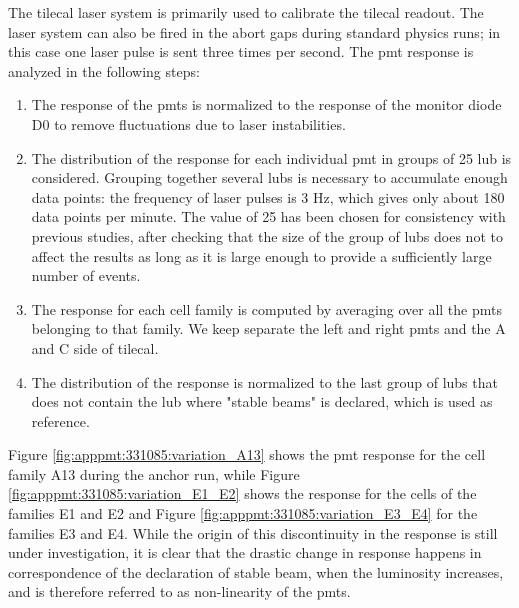 The \gls{tilecal} laser system is primarily used to calibrate the \gls{tilecal} readout. 
The laser system can also be fired in the abort gaps during standard physics runs; in this case 
one laser pulse is sent three times per second.
The \gls{pmt} response is analyzed in the following steps:
\begin{enumerate}
\item The response of the \glspl{pmt} is normalized to the response of the monitor diode D0 to remove fluctuations 
due to laser instabilities.

\item The distribution of the response for each individual \gls{pmt} in groups of 25 \gls{lub} is considered. 
Grouping together several \glspl{lub} is necessary to accumulate enough data points: the frequency of laser pulses is 3 Hz, 
which gives only about 180 data points per minute. The value of 25 has been chosen for consistency with previous studies, 
after checking that the size of the group of \glspl{lub} does not to affect the results 
as long as it is large enough to provide a sufficiently large number of events.

\item The response for each cell family is computed by averaging over all the \glspl{pmt} 
belonging to that family. We keep separate the left and right \glspl{pmt} and the A and C side 
of \gls{tilecal}.

\item The distribution of the response is normalized to the last group of \glspl{lub} that 
does not contain the \gls{lub} where "stable beams" is declared, which is used as reference.

\end{enumerate} 

Figure \ref{fig:apppmt:331085:variation_A13} shows the \gls{pmt} response for the cell family A13 during the anchor run, 
while Figure \ref{fig:apppmt:331085:variation_E1_E2} shows the response for the cells of the families E1 and E2 
and Figure \ref{fig:apppmt:331085:variation_E3_E4} for the families E3 and E4.
While the origin of this discontinuity in the response is still under investigation, it is clear that 
the drastic change in response happens in correspondence of the declaration of stable beam, when the 
luminosity increases, and is therefore referred to as non-linearity of the \glspl{pmt}. 

